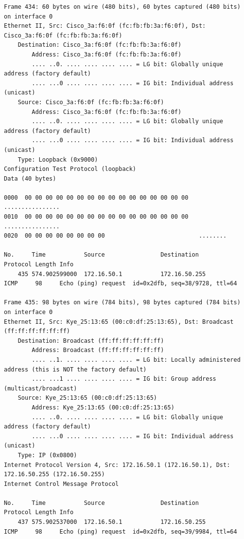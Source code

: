 \documentclass[a4paper,11pt]{article}
\begin{document}
\begin{lstlisting}
Frame 434: 60 bytes on wire (480 bits), 60 bytes captured (480 bits) on interface 0
Ethernet II, Src: Cisco_3a:f6:0f (fc:fb:fb:3a:f6:0f), Dst: Cisco_3a:f6:0f (fc:fb:fb:3a:f6:0f)
    Destination: Cisco_3a:f6:0f (fc:fb:fb:3a:f6:0f)
        Address: Cisco_3a:f6:0f (fc:fb:fb:3a:f6:0f)
        .... ..0. .... .... .... .... = LG bit: Globally unique address (factory default)
        .... ...0 .... .... .... .... = IG bit: Individual address (unicast)
    Source: Cisco_3a:f6:0f (fc:fb:fb:3a:f6:0f)
        Address: Cisco_3a:f6:0f (fc:fb:fb:3a:f6:0f)
        .... ..0. .... .... .... .... = LG bit: Globally unique address (factory default)
        .... ...0 .... .... .... .... = IG bit: Individual address (unicast)
    Type: Loopback (0x9000)
Configuration Test Protocol (loopback)
Data (40 bytes)

0000  00 00 00 00 00 00 00 00 00 00 00 00 00 00 00 00   ................
0010  00 00 00 00 00 00 00 00 00 00 00 00 00 00 00 00   ................
0020  00 00 00 00 00 00 00 00                           ........

No.     Time           Source                Destination           Protocol Length Info
    435 574.902599000  172.16.50.1           172.16.50.255         ICMP     98     Echo (ping) request  id=0x2dfb, seq=38/9728, ttl=64

Frame 435: 98 bytes on wire (784 bits), 98 bytes captured (784 bits) on interface 0
Ethernet II, Src: Kye_25:13:65 (00:c0:df:25:13:65), Dst: Broadcast (ff:ff:ff:ff:ff:ff)
    Destination: Broadcast (ff:ff:ff:ff:ff:ff)
        Address: Broadcast (ff:ff:ff:ff:ff:ff)
        .... ..1. .... .... .... .... = LG bit: Locally administered address (this is NOT the factory default)
        .... ...1 .... .... .... .... = IG bit: Group address (multicast/broadcast)
    Source: Kye_25:13:65 (00:c0:df:25:13:65)
        Address: Kye_25:13:65 (00:c0:df:25:13:65)
        .... ..0. .... .... .... .... = LG bit: Globally unique address (factory default)
        .... ...0 .... .... .... .... = IG bit: Individual address (unicast)
    Type: IP (0x0800)
Internet Protocol Version 4, Src: 172.16.50.1 (172.16.50.1), Dst: 172.16.50.255 (172.16.50.255)
Internet Control Message Protocol

No.     Time           Source                Destination           Protocol Length Info
    437 575.902537000  172.16.50.1           172.16.50.255         ICMP     98     Echo (ping) request  id=0x2dfb, seq=39/9984, ttl=64


\end{lstlisting}
\end{document}
